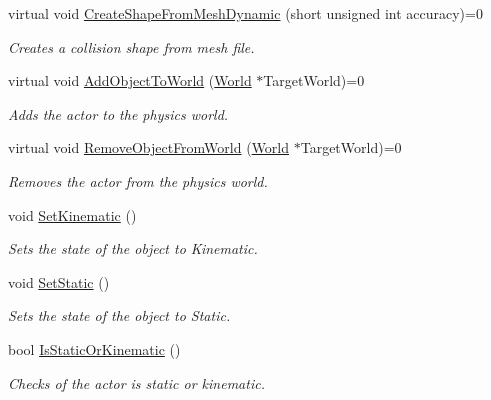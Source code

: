 \begin{DoxyCompactItemize}
virtual void \hyperlink{classphys_1_1ActorBase_aa41370f6d2031a9dad8df45bd7f3bcc6}{CreateShapeFromMeshDynamic} (short unsigned int accuracy)=0
\begin{DoxyCompactList}\small\item\em Creates a collision shape from mesh file. \item\end{DoxyCompactList}\item 
virtual void \hyperlink{classphys_1_1ActorBase_a3d28e4c4a33f50210101695cb33ded3b}{AddObjectToWorld} (\hyperlink{classphys_1_1World}{World} $\ast$TargetWorld)=0
\begin{DoxyCompactList}\small\item\em Adds the actor to the physics world. \item\end{DoxyCompactList}\item 
virtual void \hyperlink{classphys_1_1ActorBase_aaa787de7ec5d7d1d8428ea78f37bcb40}{RemoveObjectFromWorld} (\hyperlink{classphys_1_1World}{World} $\ast$TargetWorld)=0
\begin{DoxyCompactList}\small\item\em Removes the actor from the physics world. \item\end{DoxyCompactList}\item 
void \hyperlink{classphys_1_1ActorBase_acd5613286ec14fb2a8e5ed5f5003dc5f}{SetKinematic} ()
\begin{DoxyCompactList}\small\item\em Sets the state of the object to Kinematic. \item\end{DoxyCompactList}\item 
void \hyperlink{classphys_1_1ActorBase_af0219532fe71d1d84042a20a88fe5037}{SetStatic} ()
\begin{DoxyCompactList}\small\item\em Sets the state of the object to Static. \item\end{DoxyCompactList}\item 
bool \hyperlink{classphys_1_1ActorBase_a0758873d315a0f70871649493d78d739}{IsStaticOrKinematic} ()
\begin{DoxyCompactList}\small\item\em Checks of the actor is static or kinematic. \item\end{DoxyCompactList}\item 

\end{DoxyCompactItemize}
